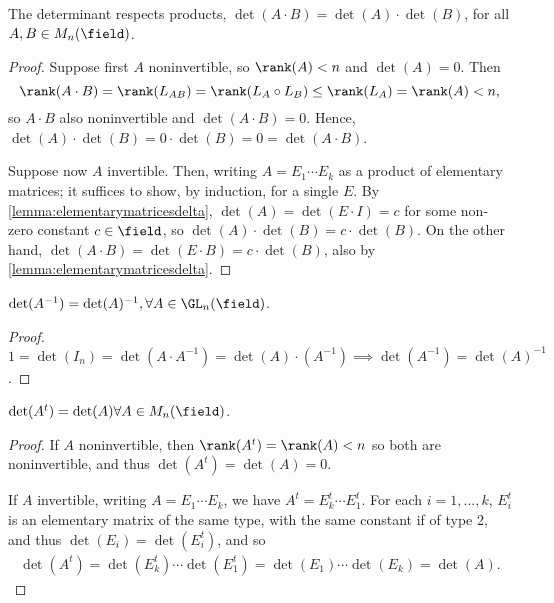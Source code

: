 \begin{theorem}
    The determinant respects products, $\det(A \cdot B) = \det(A) \cdot \det(B)$, for all $A, B \in M_n(\field)$.
\end{theorem}
\begin{proof}
    Suppose first $A$ noninvertible, so $\rank(A) < n$ and $\det(A)  = 0$. Then \[
    \rank(A \cdot B) = \rank(L_{AB}) = \rank(L_A \circ L_B) \leq \rank(L_A) = \rank(A) < n,
    \]
    so $A \cdot B$ also noninvertible and $\det(A \cdot B) = 0$. Hence, $\det(A) \cdot \det(B) = 0 \cdot \det(B) = 0 = \det(A \cdot B)$.

    Suppose now $A$ invertible. Then, writing $A = E_1 \cdots E_k$ as a product of elementary matrices; it suffices to show, by induction, for a single $E$. By \cref{lemma:elementarymatricesdelta}, $\det(A) = \det(E \cdot I) = c$ for some non-zero constant $c \in \field$, so $\det(A) \cdot \det(B) = c \cdot \det(B)$. On the other hand, $\det(A \cdot B) = \det(E \cdot B) = c \cdot \det(B)$, also by \cref{lemma:elementarymatricesdelta}.
\end{proof}
\begin{corollary}
    $\det(A^{-1}) = \det(A)^{-1}, \forall A \in \GL_n(\field)$.
\end{corollary}
\begin{proof}
    $1 = \det(I_n) = \det(A \cdot A^{-1}) = \det(A) \cdot (A^{-1}) \implies \det(A^{-1}) = \det(A)^{-1}$.
\end{proof}
\begin{corollary}
    $\det(A^t) = \det(A) \forall A \in M_n(\field)$.
\end{corollary}
\begin{proof}
    If $A$ noninvertible, then $\rank(A^t) = \rank(A) < n$ so both are noninvertible, and thus $\det(A^t) = \det(A) = 0$.

    If $A$ invertible, writing $A = E_{1} \cdots E_k$, we have $A^t = E_k^t \cdots E_1^t$. For each $i = 1, \dots, k$, $E_i^t$ is an elementary matrix of the same type, with the same constant if of type 2, and thus $\det(E_i) = \det(E_i^t)$, and so \begin{align*}
        \det(A^t) = \det(E_k^t) \cdots \det(E_1^t) = \det(E_1) \cdots \det(E_k) = \det(A).
    \end{align*}
\end{proof}